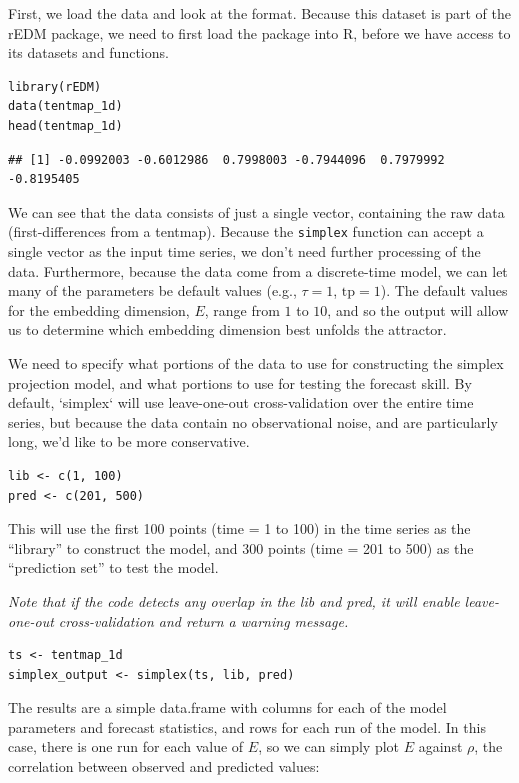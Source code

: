 First, we load the data and look at the format. Because this dataset is part of the rEDM package, we need to first load the package into R, before we have access to its datasets and functions.

\begin{lstlisting}
library(rEDM)
data(tentmap_1d)
head(tentmap_1d)
\end{lstlisting}

\begin{lstlisting}[backgroundcolor=\color{white}, commentstyle=\ttfamily]
## [1] -0.0992003 -0.6012986  0.7998003 -0.7944096  0.7979992 -0.8195405
\end{lstlisting}

We can see that the data consists of just a single vector, containing the raw data (first-differences from a tentmap). Because the \lstinline{simplex} function can accept a single vector as the input time series, we don't need further processing of the data. Furthermore, because the data come from a discrete-time model, we can let many of the parameters be default values (e.g., $\tau = 1$, $\text{tp} = 1$). The default values for the embedding dimension, $E$, range from $1$ to $10$, and so the output will allow us to determine which embedding dimension best unfolds the attractor.

We need to specify what portions of the data to use for constructing the simplex projection model, and what portions to use for testing the forecast skill. By default, `simplex` will use leave-one-out cross-validation over the entire time series, but because the data contain no observational noise, and are particularly long, we'd like to be more conservative.

\begin{lstlisting}
lib <- c(1, 100)
pred <- c(201, 500)
\end{lstlisting}

This will use the first 100 points (time = 1 to 100) in the time series as the ``library'' to construct the model, and 300 points (time = 201 to 500) as the ``prediction set'' to test the model.

\emph{Note that if the code detects any overlap in the lib and pred, it will enable leave-one-out cross-validation and return a warning message.}

\begin{lstlisting}
ts <- tentmap_1d
simplex_output <- simplex(ts, lib, pred)
\end{lstlisting}

The results are a simple data.frame with columns for each of the model parameters and forecast statistics, and rows for each run of the model. In this case, there is one run for each value of $E$, so we can simply plot $E$ against $\rho$, the correlation between observed and predicted values:

